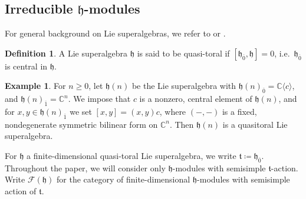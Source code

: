 \documentclass[12pt, a4paper, reqno]{amsart}
\def\C{\mathbb{C}}
\def\FF{\mathcal{F}}
\def\h{\mathfrak{h}}
\def\ol{\overline}
\theoremstyle{definition}
\newtheorem{definition}{Definition}
\theoremstyle{definition}
\theoremstyle{definition}
\newtheorem{example}{Example}}
\numberwithin{theorem}{section}
\numberwithin{lemma}{section}
\numberwithin{remark}{section}
\numberwithin{definition}{section}
\numberwithin{corollary}{section}
\numberwithin{proposition}{section}
\numberwithin{example}{section}
\begin{document}
	\subsection{Irreducible \(\mathfrak{h}\)-modules}\label{section-irreducible-h-modules}
	
	For general background on Lie superalgebras, we refer to \cite{CW} or \cite{M}.
	\begin{definition}\label{definition-quasi-toral}
		A Lie superalgebra \(\mathfrak{h}\) is said to be quasi-toral if \([\mathfrak{h}_{\ol{0}},\mathfrak{h}] = 0\), i.e.~$\h_{\ol{0}}$ is central in $\h$.
	\end{definition}
	
	\begin{example}\label{example of h_n}
		For $n\geq0$, let $\h(n)$ be the Lie superalgebra with $\h(n)_{\ol{0}}=\C\langle c\rangle$, and $\h(n)_{\ol{1}}=\C^n$.  We impose that $c$ is a nonzero, central element of $\h(n)$, and for $x,y\in\h(n)_{\ol{1}}$ we set $[x,y]=(x,y)c$, where $(-,-)$ is a fixed, nondegenerate symmetric bilinear form on $\C^n$.  Then $\h(n)$ is a quasitoral Lie superalgebra.
	\end{example}
	
	For \(\mathfrak{h}\) a finite-dimensional quasi-toral Lie superalgebra, we write \(\mathfrak{t} \coloneq \mathfrak{h}_{\ol{0}}\). Throughout the paper, we will consider only \(\mathfrak{h}\)-modules with semisimple \(\mathfrak{t}\)-action.  Write $\FF(\h)$ for the category of finite-dimensional $\h$-modules with semisimple action of $\mathfrak{t}$.
	
\end{document}
